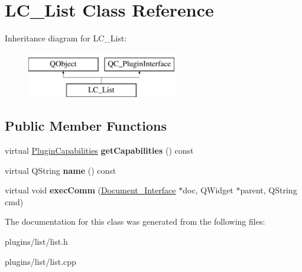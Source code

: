 \hypertarget{classLC__List}{\section{L\-C\-\_\-\-List Class Reference}
\label{classLC__List}
}
Inheritance diagram for L\-C\-\_\-\-List\-:\begin{figure}[H]
\begin{center}
\leavevmode
\includegraphics[height=2.000000cm]{classLC__List}
\end{center}
\end{figure}
\subsection*{Public Member Functions}
\begin{DoxyCompactItemize}
\item 
\hypertarget{classLC__List_a99baad6b46de7c7b18ccac450a7cd19f}{virtual \hyperlink{classPluginCapabilities}{Plugin\-Capabilities} {\bfseries get\-Capabilities} () const }\label{classLC__List_a99baad6b46de7c7b18ccac450a7cd19f}

\item 
\hypertarget{classLC__List_a7adffb961d8f0a95a66b56af6ed0646b}{virtual Q\-String {\bfseries name} () const }\label{classLC__List_a7adffb961d8f0a95a66b56af6ed0646b}

\item 
\hypertarget{classLC__List_ae6df826b06243f1fb0cf301fe41e873a}{virtual void {\bfseries exec\-Comm} (\hyperlink{classDocument__Interface}{Document\-\_\-\-Interface} $\ast$doc, Q\-Widget $\ast$parent, Q\-String cmd)}\label{classLC__List_ae6df826b06243f1fb0cf301fe41e873a}

\end{DoxyCompactItemize}


The documentation for this class was generated from the following files\-:\begin{DoxyCompactItemize}
\item 
plugins/list/list.\-h\item 
plugins/list/list.\-cpp\end{DoxyCompactItemize}
